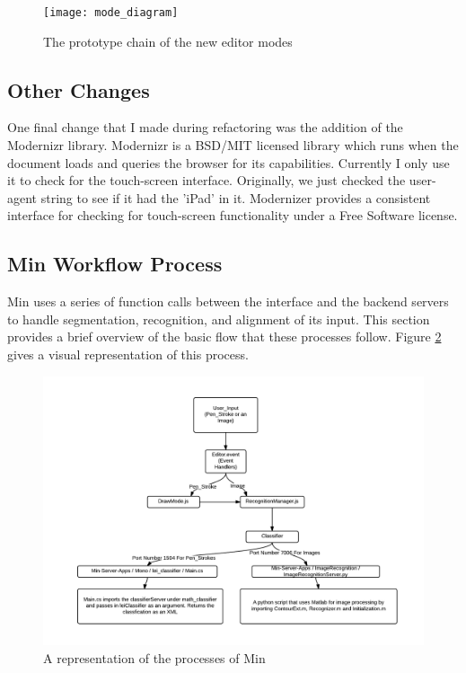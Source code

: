 \documentclass[letterpaper]{article}
\begin{document}
\begin{figure}[h]
    \begin{center}
        \texttt{[image: mode\_diagram]}
    \end{center}
    \caption{The prototype chain of the new editor modes}
    \label{fig:modes}
\end{figure}

\subsection*{Other Changes}

One final change that I made during refactoring was the addition of the
Modernizr library. Modernizr is a BSD/MIT licensed library which runs when the
document loads and queries the browser for its capabilities. Currently I only use it to
check for the touch-screen interface. Originally, we just checked the user-agent
string to see if it had the 'iPad' in it. Modernizer provides a consistent
interface for checking for touch-screen functionality under a Free Software
license.

\subsection*{Min Workflow Process}
Min uses a series of function calls between the interface and the backend servers to handle
segmentation, recognition, and alignment of its input. This section provides a brief overview
of the basic flow that these processes follow. Figure \ref{fig:frontToBack} gives a visual
representation of this process.

\begin{figure}[H]
    \begin{center}
        \includegraphics[width=\textwidth]{FrontToBackEndFlow.png}
    \end{center}
    \caption{A representation of the processes of Min}
    \label{fig:frontToBack}
\end{figure}
\end{document}
